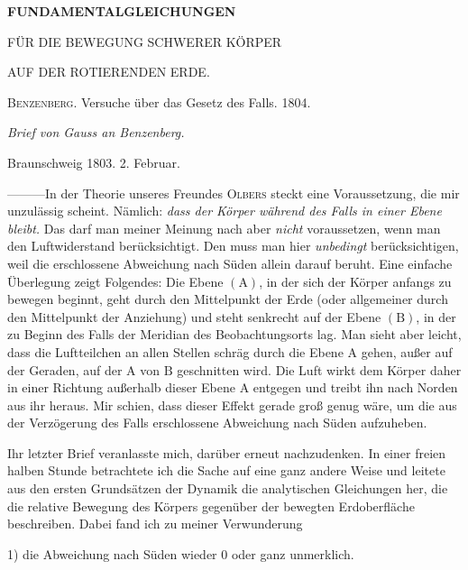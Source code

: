 \begin{center}
{\large\bfseries FUNDAMENTALGLEICHUNGEN\par\medskip FÜR DIE BEWEGUNG SCHWERER KÖRPER\par\medskip AUF DER ROTIERENDEN ERDE.\par}
\bigskip
\textsc{Benzenberg}. Versuche über das Gesetz des Falls. 1804.
\par\bigskip
{\large\itshape Brief von Gauss an Benzenberg.\par}
\end{center}
\begin{flushright}Braunschweig 1803. 2. Februar.\end{flushright}
—\quad—\quad—\quad In der Theorie unseres Freundes \textsc{Olbers} steckt eine Voraussetzung, die mir unzulässig scheint. Nämlich: \textit{dass der Körper während des Falls in einer Ebene bleibt.} Das darf man meiner Meinung nach aber \textit{nicht} voraussetzen, wenn man den Luftwiderstand berücksichtigt. Den muss man hier \textit{unbedingt} berücksichtigen, weil die erschlossene Abweichung nach Süden allein darauf beruht. Eine einfache Überlegung zeigt Folgendes: Die Ebene $(\mathrm{A})$, in der sich der Körper anfangs zu bewegen beginnt, geht durch den Mittelpunkt der Erde (oder allgemeiner durch den Mittelpunkt der Anziehung) und steht senkrecht auf der Ebene $(\mathrm{B})$, in der zu Beginn des Falls der Meridian des Beobachtungsorts lag. Man sieht aber leicht, dass die Luftteilchen an allen Stellen schräg durch die Ebene $\mathrm{A}$ gehen, außer auf der Geraden, auf der $\mathrm{A}$ von $\mathrm{B}$ geschnitten wird. Die Luft wirkt dem Körper daher in einer Richtung außerhalb dieser Ebene $\mathrm{A}$ entgegen und treibt ihn nach Norden aus ihr heraus. Mir schien, dass dieser Effekt gerade groß genug wäre, um die aus der Verzögerung des Falls erschlossene Abweichung nach Süden aufzuheben.

Ihr letzter Brief veranlasste mich, darüber erneut nachzudenken. In einer freien halben Stunde betrachtete ich die Sache auf eine ganz andere Weise und leitete aus den ersten Grundsätzen der Dynamik die analytischen Gleichungen her,
die die relative Bewegung des Körpers gegenüber der bewegten Erdoberfläche beschreiben. Dabei fand ich zu meiner Verwunderung

1) die Abweichung nach Süden wieder $0$ oder ganz unmerklich.

